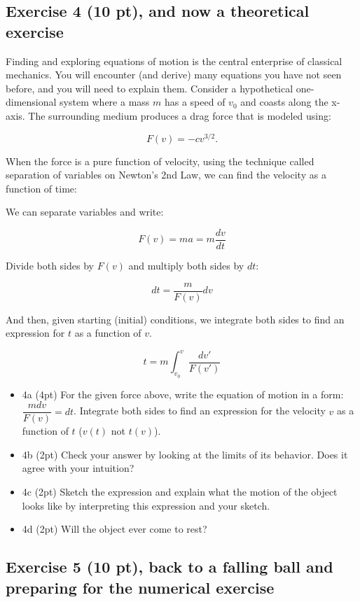 \documentclass[11pt]{article}
\providecommand{\tightlist}{%
      \setlength{\itemsep}{0pt}\setlength{\parskip}{0pt}}
\begin{document}
    \subsection{Exercise 4 (10 pt), and now a theoretical
exercise}\label{exercise-4-10-pt-and-now-a-theoretical-exercise}

Finding and exploring equations of motion is the central enterprise of
classical mechanics. You will encounter (and derive) many equations you
have not seen before, and you will need to explain them. Consider a
hypothetical one-dimensional system where a mass \(m\) has a speed of
\(v_0\) and coasts along the x-axis. The surrounding medium produces a
drag force that is modeled using:

\[F(v) = -c v^{3/2}.\]

When the force is a pure function of velocity, using the technique
called separation of variables on Newton's 2nd Law, we can find the
velocity as a function of time:

We can separate variables and write:

\[F(v) = m a = m \dfrac{dv}{dt}\]

Divide both sides by \(F(v)\) and multiply both sides by \(dt\):

\[dt = \dfrac{m}{F(v)}dv\]

And then, given starting (initial) conditions, we integrate both sides
to find an expression for \(t\) as a function of \(v\).

\[t = m \int_{v_0}^v \dfrac{dv'}{F(v')}\]

\begin{itemize}
\tightlist
\item
  4a (4pt) For the given force above, write the equation of motion in a
  form: \(\dfrac{m dv}{F(v)} = dt\). Integrate both sides to find an
  expression for the velocity \(v\) as a function of \(t\) (\(v(t)\) not
  \(t(v)\)).
\item
  4b (2pt) Check your answer by looking at the limits of its behavior.
  Does it agree with your intuition?
\item
  4c (2pt) Sketch the expression and explain what the motion of the
  object looks like by interpreting this expression and your sketch.
\item
  4d (2pt) Will the object ever come to rest?
\end{itemize}

    \subsection{Exercise 5 (10 pt), back to a falling ball and preparing for
the numerical
exercise}\label{exercise-5-10-pt-back-to-a-falling-ball-and-preparing-for-the-numerical-exercise}
\end{document}
